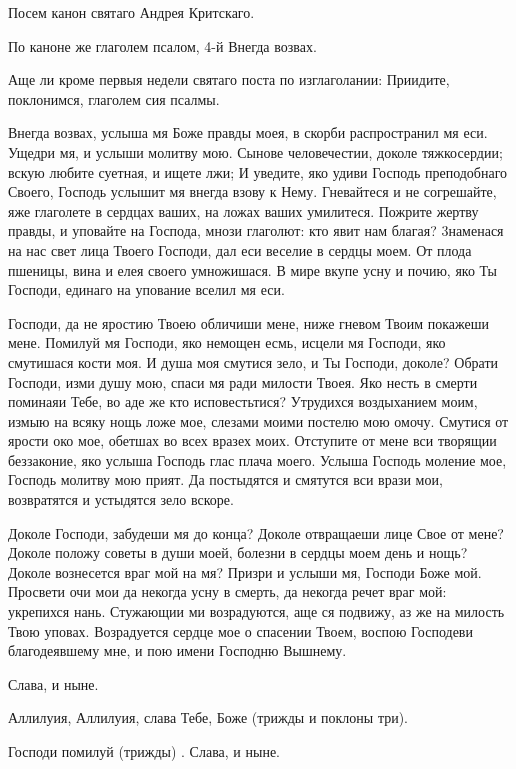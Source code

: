 Посем канон святаго Андрея Критскаго.

По каноне же глаголем псалом, 4-й Внегда возвах.

Аще ли кроме первыя недели святаго поста по изглаголании: Приидите, поклонимся, глаголем сия псалмы.

Внегда возвах, услыша мя Боже правды моея, в скорби распространил мя еси. Ущедри мя, и услыши молитву мою. Сынове человечестии, доколе тяжкосердии; вскую любите суетная, и ищете лжи; И уведите, яко удиви Господь преподобнаго Своего, Господь услышит мя внегда взову к Нему. Гневайтеся и не согрешайте, яже глаголете в сердцах ваших, на ложах ваших умилитеся. Пожрите жертву правды, и уповайте на Господа, мнози глаголют: кто явит нам благая? 3наменася на нас свет лица Твоего Господи, дал еси веселие в сердцы моем. От плода пшеницы, вина и елея своего умножишася. В мире вкупе усну и почию, яко Ты Господи, единаго на упование вселил мя еси.




Господи, да не яростию Твоею обличиши мене, ниже гневом Твоим покажеши мене. Помилуй мя Господи, яко немощен есмь, исцели мя Господи, яко смутишася кости моя. И душа моя смутися зело, и Ты Господи, доколе? Обрати Господи, изми душу мою, спаси мя ради милости Твоея. Яко несть в смерти поминаяи Тебе, во аде же кто исповестьтися? Утрудихся воздыханием моим, измыю на всяку нощь ложе мое, слезами моими постелю мою омочу. Смутися от ярости око мое, обетшах во всех вразех моих. Отступите от мене вси творящии беззаконие, яко услыша Господь глас плача моего. Услыша Господь моление мое, Господь молитву мою прият. Да постыдятся и смятутся вси врази мои, возвратятся и устыдятся зело вскоре.




Доколе Господи, забудеши мя до конца? Доколе отвращаеши лице Свое от мене? Доколе положу советы в души моей, болезни в сердцы моем день и нощь? Доколе вознесется враг мой на мя? Призри и услыши мя, Господи Боже мой. Просвети очи мои да некогда усну в смерть, да некогда речет враг мой: укрепихся нань. Стужающии ми возрадуются, аще ся подвижу, аз же на милость Твою уповах. Возрадуется сердце мое о спасении Твоем, воспою Господеви благодеявшему мне, и пою имени Господню Вышнему.

Слава, и ныне. 

Аллилуия, Аллилуия, слава Тебе, Боже (трижды и поклоны три). 

Господи помилуй (трижды) . Слава, и ныне.


